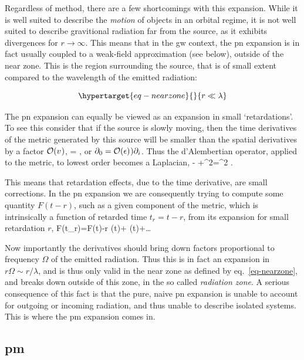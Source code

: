 \documentclass[
  10pt,
  a4paper,
  DIV=11,
  numbers=noendperiod,
  twoside]{scrreprt}
\let\[\relax \let\]\relax %
\DeclareRobustCommand{\[}{\begin{equation}}
\DeclareRobustCommand{\]}{\end{equation}}
\begin{document}
Regardless of method, there are a few shortcomings with this expansion.
While it is well suited to describe the \emph{motion} of objects in an
orbital regime, it is not well suited to describe gravitional radiation
far from the source, as it exhibits divergences for
\(r\to\infty\).
This means that in the \gls{gw} context, the \gls{pn} expansion is in
fact usually coupled to a weak-field approximation (see below), outside
of the near zone. This is the region surrounding the source, that is of
small extent compared to the wavelength of the emitted radiation:

\begin{equation}\protect\hypertarget{eq-nearzone}{}{
r \ll \lambda
}\label{eq-nearzone}\end{equation}

The \gls{pn} expansion can equally be viewed as an expansion in small
`retardations'. To see this consider that if the source is slowly
moving, then the time derivatives of the metric generated by this source
will be smaller than the spatial derivatives by a factor \(\mathcal{O}(v^{})\),
\[
= ,
\] or \(\partial_0=\mathcal{O}(\epsilon)^{}) \partial_i\). Thus the
d'Alembertian operator, applied to the metric, to lowest order becomes a
Laplacian, \[
- +\nabla^2= \nabla^2 .
\]

This means that retardation effects, due to the time derivative, are
small corrections. In the \gls{pn} expansion we are consequently trying
to compute some quantity \(F(t-r)\), such as a given component of the
metric, which is intrinsically a function of retarded time \(t_r=t-r\),
from its expansion for small retardation \(r\), \[
F(t_r)=F(t)-{r} (t)+ (t)+\ldots
\]

Now importantly the derivatives should bring down factors proportional
to frequency \(\Omega\) of the emitted radiation. Thus this is in fact
an expansion in \(r \Omega\sim r / \lambda\), and is thus only valid in
the near zone as defined by eq.~\ref{eq-nearzone}, and breaks down
outside of this zone, in the so called \emph{radiation zone}. A serious
consequence of this fact is that the pure, naive \gls{pn} expansion is
unable to account for outgoing or incoming radiation, and thus unable to
describe isolated systems. This is where the \gls{pm} expansion comes
in.

\hypertarget{pm}{%
\subsection{\texorpdfstring{\gls{pm}}{}}\label{pm}}
\end{document}
